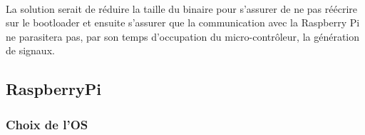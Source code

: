 \paragraph{}
  La solution serait de réduire la taille du binaire pour s'assurer de ne pas
réécrire sur le bootloader et ensuite s'assurer que la communication avec la
Raspberry Pi ne parasitera pas, par son temps d'occupation du
micro-contrôleur, la génération de signaux.\\


\subsection{RaspberryPi}

\subsubsection{Choix de l'OS}
